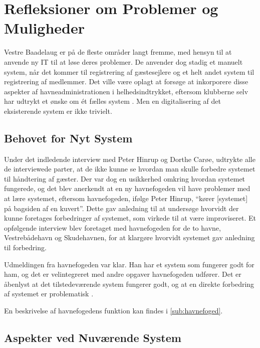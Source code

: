 \section{Refleksioner om Problemer og Muligheder}
\label{sec:refleksioner}

Vestre Baadelaug er på de fleste områder langt fremme, med hensyn til at anvende ny IT til at løse deres problemer. De anvender dog stadig et manuelt system, når det kommer til registrering af gæstesejlere og et helt andet system til registrering af medlemmer. Det ville være oplagt at forsøge at inkorporere disse aspekter af havneadministrationen i helhedsindtrykket, eftersom klubberne selv har udtrykt et ønske om ét fælles system \cite{int_vb_sl}. Men en digitalisering af det eksisterende system er ikke trivielt.

\subsection{Behovet for Nyt System}

Under det indledende interview med Peter Hinrup og Dorthe Carøe, udtrykte alle de interviewede parter, at de ikke kunne se hvordan man skulle forbedre systemet til håndtering af gæster. Der var dog en usikkerhed omkring hvordan systemet fungerede, og det blev anerkendt at en ny havnefogeden vil have problemer med at lære systemet, eftersom havnefogeden, ifølge Peter Hinrup, \enquote{kører [systemet] på bagsiden af en kuvert}. Dette gav anledning til at undersøge hvorvidt der kunne foretages forbedringer af systemet, som virkede til at være improviseret. Et opfølgende interview blev foretaget med havnefogeden for de to havne, Vestrebådehavn og Skudehavnen, for at klargøre hvorvidt systemet gav anledning til forbedring.

Udmeldingen fra havnefogeden var klar. Han har et system som fungerer godt for ham, og det er velintegreret med andre opgaver havnefogeden udfører. Det er åbenlyst at det tilstedeværende system fungerer godt, og at en direkte forbedring af systemet er problematisk \cite{int_hf}. 

En beskrivelse af havnefogedens funktion kan findes i \cref{sub:havnefoged}.

\subsection{Aspekter ved Nuværende System}

